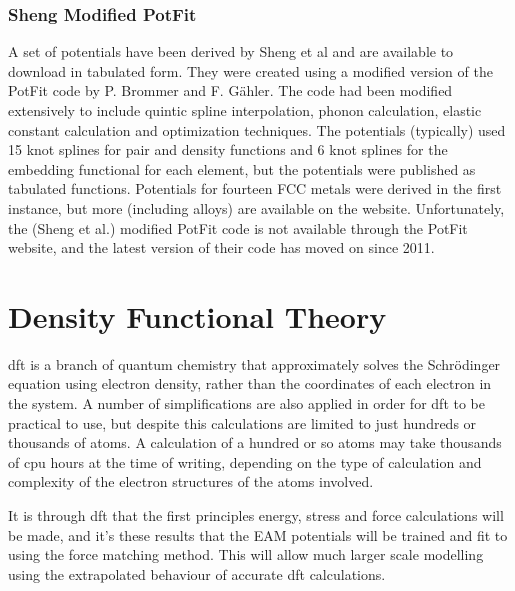 \subsubsection{Sheng Modified PotFit}
\label{section:shengeampotentials}

A set of potentials have been derived by Sheng et al\cite{shengeam} and are available to download in tabulated form\cite{shengeamonline}.   They were created using a modified version of the PotFit code by P. Brommer and F. G\"ahler\cite{pbrommer}.  The code had been modified extensively to include quintic spline interpolation, phonon calculation, elastic constant calculation and optimization techniques\cite{shengeamonline}.  The potentials (typically) used 15 knot splines for pair and density functions and 6 knot splines for the embedding functional for each element, but the potentials were published as tabulated functions.  Potentials for fourteen FCC metals were derived in the first instance, but more (including alloys) are available on the website.  Unfortunately, the (Sheng et al.) modified PotFit code is not available through the PotFit website\cite{pbrommer}, and the latest version of their code has moved on since 2011.










\section{Density Functional Theory}

\Acrfull{dft} is a branch of quantum chemistry that approximately solves the Schr\"{o}dinger equation using electron density, rather than the coordinates of each electron in the system.  A number of simplifications are also applied in order for \acrshort{dft} to be practical to use, but despite this calculations are limited to just hundreds or thousands of atoms.  A calculation of a hundred or so atoms may take thousands of \acrshort{cpu} hours at the time of writing, depending on the type of calculation and complexity of the electron structures of the atoms involved.

It is through \acrshort{dft} that the first principles energy, stress and force calculations will be made, and it's these results that the EAM potentials will be trained and fit to using the force matching method.  This will allow much larger scale modelling using the extrapolated behaviour of accurate \acrshort{dft} calculations.



